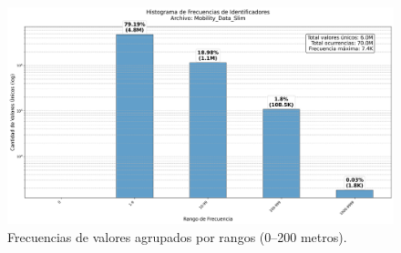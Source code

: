 \begin{figure}[H]
    \centering
    \includegraphics[width=\textwidth]{img/histograma_identifier_Mobility_Data_Slim.png}
    \caption{Frecuencias de valores agrupados por rangos (0–200 metros).}
    \label{fig:identifier_histogram_dup}
\end{figure}

